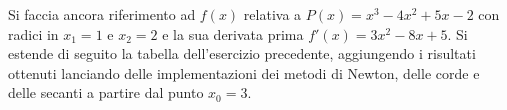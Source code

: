 \begin{center}
\footnotesize\noindent{}\end{center}

\noindent Si faccia ancora riferimento ad \(f(x)\) relativa a \(P(x)=x^3 - 4x^2 + 5x - 2\) con radici in \(x_1=1\) e \(x_2=2\) e la sua derivata prima \(f'(x) = 3x^2 - 8x + 5\). Si estende di seguito la tabella dell'esercizio precedente, aggiungendo i risultati ottenuti lanciando delle implementazioni dei metodi di Newton, delle corde e delle secanti a partire dal punto \(x_0 = 3\).\\

